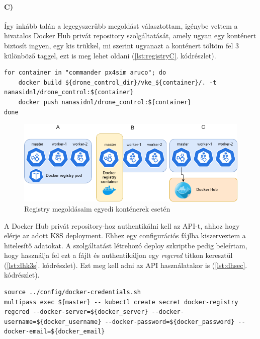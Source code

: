 \paragraph{C)}
Így inkább talán a legegyszerűbb megoldást választottam, igénybe vettem a hivatalos Docker Hub privát repository szolgáltatását, amely ugyan egy konténert biztosít ingyen, egy kis trükkel, mi szerint ugyanazt a konténert töltöm fel 3 különböző taggel, ezt is meg lehet oldani (\ref{lst:registryC}. kódrészlet).
\begin{minipage}{\linewidth}
\begin{lstlisting}[caption={Docker Hub build és push},label={lst:registryC}]
for container in "commander px4sim aruco"; do
	docker build ${drone_control_dir}/vke_${container}/. -t nanasidnl/drone_control:${container}
	docker push nanasidnl/drone_control:${container}
done
\end{lstlisting}
\end{minipage}

 \begin{figure}
 	\centering
 	\includegraphics[width=\linewidth]{figures/registry.png}
 	\caption{Registry megoldásaim egyedi konténerek esetén}
 	\label{fig:registry}
 \end{figure}

\noindent
A Docker Hub privát repository-hoz authentikálni kell az API-t, ahhoz hogy elérje az adott K8S deployment. Ehhez egy configurációs fájlba kiszerveztem a hitelesítő adatokat. A szolgáltatást létrehozó deploy szkriptbe pedig beleírtam, hogy használja fel ezt a fájlt és authentikáljon egy \emph{regcred} titkon keresztül (\ref{lst:dhk3s}. kódrészlet). Ezt meg kell adni az API használatakor is (\ref{lst:dhsec}. kódrészlet).
\begin{minipage}{\linewidth}
\begin{lstlisting}[caption={Docker Hub authentikáció K3S-ről},label={lst:dhk3s}]
source ../config/docker-credentials.sh
multipass exec ${master} -- kubectl create secret docker-registry regcred --docker-server=${docker_server} --docker-username=${docker_username} --docker-password=${docker_password} --docker-email=${docker_email}
\end{lstlisting}
\end{minipage}

